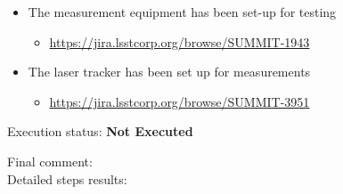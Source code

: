 \documentclass[SE,lsstdraft,STR,toc]{lsstdoc}
\providecommand{\tightlist}{
  \setlength{\itemsep}{0pt}\setlength{\parskip}{0pt}}
\begin{document}
\begin{itemize}
\tightlist
\item
  The measurement equipment has been set-up for testing

  \begin{itemize}
  \tightlist
  \item
    \url{https://jira.lsstcorp.org/browse/SUMMIT-1943}
  \end{itemize}
\item
  The laser tracker has been set up for measurements

  \begin{itemize}
  \tightlist
  \item
    \url{https://jira.lsstcorp.org/browse/SUMMIT-3951}
  \end{itemize}
\end{itemize}

Execution status: {\bf Not Executed }

Final comment:\\


Detailed steps results:
\end{document}

